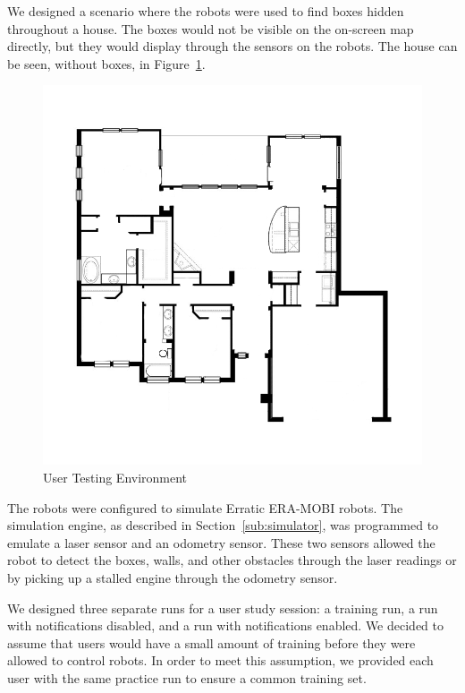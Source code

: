We designed a scenario where the robots were used to find boxes hidden throughout a house. The boxes would not be visible on the on-screen map directly, but they would display through the sensors on the robots. The house can be seen, without boxes, in Figure~\ref{fig:test-environment}. 

\begin{figure}[ht]
\begin{center}
\includegraphics[width=5in]{images/generic-house.png}
\caption{User Testing Environment\label{fig:test-environment}}
\end{center}
\end{figure}

The robots were configured to simulate Erratic ERA-MOBI robots. The simulation engine, as described in Section~\ref{sub:simulator}, was programmed to emulate a laser sensor and an odometry sensor. These two sensors allowed the robot to detect the boxes, walls, and other obstacles through the laser readings or by picking up a stalled engine through the odometry sensor.

We designed three separate runs for a user study session: a training run, a run with notifications disabled, and a run with notifications enabled. We decided to assume that users would have a small amount of training before they were allowed to control robots. In order to meet this assumption, we provided each user with the same practice run to ensure a common training set.

